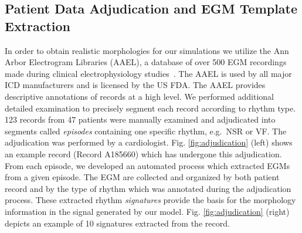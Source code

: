  \subsection{Patient Data Adjudication and EGM Template Extraction}
In order to obtain realistic morphologies for our simulations we utilize the Ann Arbor Electrogram Libraries (AAEL), a database of over 500 \ac{EGM} recordings made during clinical electrophysiology studies~\cite{AAEL}. 
The AAEL is used by all major \ac{ICD} manufacturers and is licensed by the US FDA. 
The AAEL provides descriptive annotations of records at a high level.
We performed additional detailed examination to precisely segment each record according to rhythm type.
123 records from 47 patients were manually examined and adjudicated into segments called \emph{episodes} containing one specific rhythm, e.g.\, \ac{NSR} or \ac{VF}. 
The adjudication was performed by a cardiologist.
Fig. \ref{fig:adjudication} (left) shows an example record (Record A185660) which has undergone this adjudication.
From each episode, we developed an automated process which extracted \ac{EGM}s from a given episode. 
The \ac{EGM} are collected and organized by both patient record and by the type of rhythm which was annotated during the adjudication process.
These extracted rhythm \emph{signatures} provide the basis for the morphology information in the signal generated by our model.
Fig. \ref{fig:adjudication} (right) depicts an example of 10 signatures extracted from the record. 

